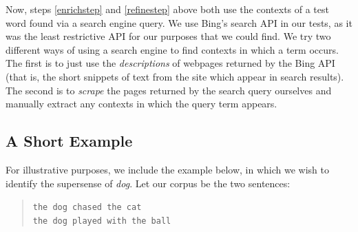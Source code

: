\documentclass{article}
\begin{document}
Now, steps \ref{enrichstep} and \ref{refinestep} above both use the contexts of a test word found via a search engine query.
We use Bing's search API in our tests, as it was the least restrictive API for our purposes that we could find.
We try two different ways of using a search engine to find contexts in which a term occurs.
The first is to just use the {\it descriptions} of webpages returned by the Bing API (that is, the short snippets of text from the site which appear in search results).
The second is to {\it scrape} the pages returned by the search query ourselves and manually extract any contexts in which the query term appears.

\subsection{A Short Example}
For illustrative purposes, we include the example below, in which we wish to identify the supersense of {\it dog}. 
Let our corpus be the two sentences:
\begin{quote}
\texttt{the dog chased the cat\\ the dog played with the ball}
\end{quote}
\end{document}
